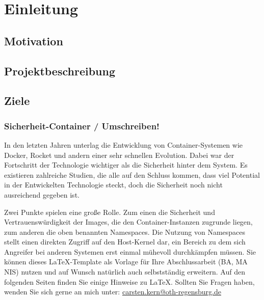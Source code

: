 \thispagestyle{empty}
\section{Einleitung}
\subsection{Motivation}
\subsection{Projektbeschreibung}
\subsection{Ziele}

\subsubsection{Sicherheit-Container / Umschreiben!}
In den letzten Jahren unterlag die Entwicklung von Container-Systemen wie Docker, Rocket und andern einer sehr schnellen Evolution. Dabei war der Fortschritt der Technologie wichtiger als die Sicherheit hinter dem System. Es existieren zahlreiche Studien, die alle auf den Schluss kommen, dass viel Potential in der Entwickelten Technologie steckt, doch die Sicherheit noch nicht ausreichend gegeben ist.

Zwei Punkte spielen eine große Rolle. Zum einen die Sicherheit und Vertrauenswürdigkeit der Images, die den Container-Instanzen zugrunde liegen, zum anderen die oben benannten Namespaces. Die Nutzung von Namespaces stellt einen direkten Zugriff auf den Host-Kernel dar, ein Bereich zu dem sich Angreifer bei anderen Systemen erst einmal mühevoll durchkämpfen müssen.
Sie können dieses \LaTeX-Template als Vorlage für Ihre Abschlussarbeit (\ac{BA}, \ac{MA} \ac{NIS}) nutzen und auf Wunsch natürlich auch selbstständig erweitern. Auf den folgenden Seiten finden Sie einige Hinweise zu \LaTeX. Sollten Sie Fragen haben, wenden Sie sich gerne an mich unter: \url{carsten.kern@oth-regensburg.de} 

\pagebreak